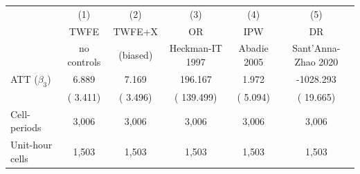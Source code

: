 \begin{tabular}{l c c c c c}
\toprule
 & (1) & (2) & (3) & (4) & (5) \\
 & TWFE & TWFE+X & OR & IPW & DR \\
 & no controls & (biased) & Heckman-IT 1997 & Abadie 2005 & Sant'Anna-Zhao 2020 \\
\midrule
ATT ($\beta_3$) &     6.889 &     7.169 &   196.167 &     1.972 & -1028.293 \\
  & (    3.411) & (    3.496) & (  139.499) & (    5.094) & (   19.665) \\
\midrule
Cell-periods & 3{,}006 & 3{,}006 & 3{,}006 & 3{,}006 & 3{,}006 \\
Unit-hour cells & 1{,}503 & 1{,}503 & 1{,}503 & 1{,}503 & 1{,}503 \\
\bottomrule
\end{tabular}
